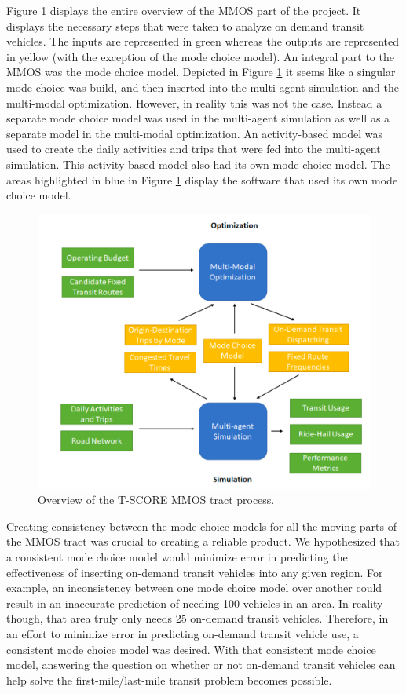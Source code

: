 \documentclass[12pt, oneside, openright]{byuthesis}
\begin{document}
Figure \ref{fig:mmos} displays the entire overview of the MMOS part of the project. It displays the necessary steps that were taken to analyze on demand transit vehicles. The inputs are represented in green whereas the outputs are represented in yellow (with the exception of the mode choice model). An integral part to the MMOS was the mode choice model. Depicted in Figure \ref{fig:mmos} it seems like a singular mode choice was build, and then inserted into the multi-agent simulation and the multi-modal optimization. However, in reality this was not the case. Instead a separate mode choice model was used in the multi-agent simulation as well as a separate model in the multi-modal optimization. An activity-based model was used to create the daily activities and trips that were fed into the multi-agent simulation. This activity-based model also had its own mode choice model. The areas highlighted in blue in Figure \ref{fig:mmos} display the software that used its own mode choice model.

\begin{figure}

{\centering \includegraphics[width=0.75\linewidth]{pics/mmos} 

}

\caption{Overview of the T-SCORE MMOS tract process.}\label{fig:mmos}
\end{figure}

Creating consistency between the mode choice models for all the moving parts of the MMOS tract was crucial to creating a reliable product. We hypothesized that a consistent mode choice model would minimize error in predicting the effectiveness of inserting on-demand transit vehicles into any given region. For example, an inconsistency between one mode choice model over another could result in an inaccurate prediction of needing 100 vehicles in an area. In reality though, that area truly only needs 25 on-demand transit vehicles. Therefore, in an effort to minimize error in predicting on-demand transit vehicle use, a consistent mode choice model was desired. With that consistent mode choice model, answering the question on whether or not on-demand transit vehicles can help solve the first-mile/last-mile transit problem becomes possible.
\end{document}
